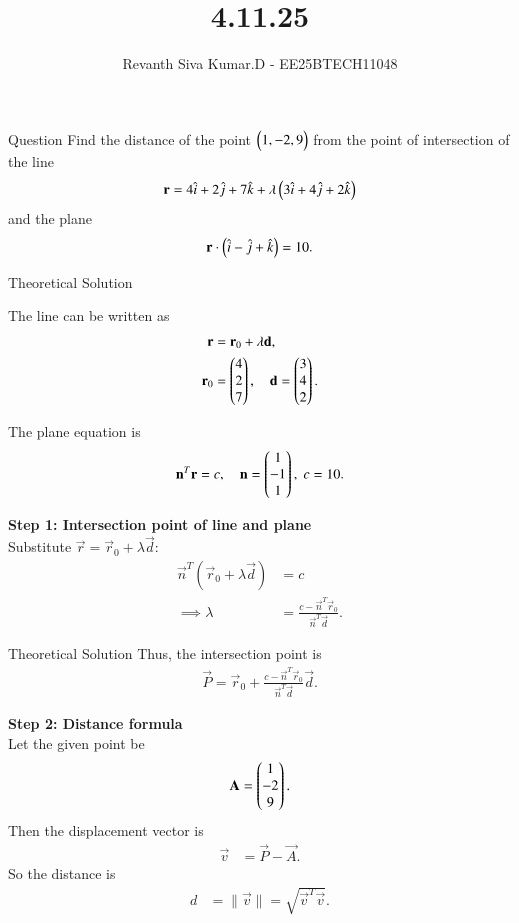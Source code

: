 \documentclass{beamer}
\title %
{4.11.25}
\author %
{Revanth Siva Kumar.D - EE25BTECH11048}
\begin{document}
	
	\frame{\titlepage}
	\begin{frame}{Question}
			Find the distance of the point $\begin{pmatrix}1,-2,9\end{pmatrix}$ from the point of intersection of the line
\[
\mathbf{r} = 4\hat{i} + 2\hat{j} + 7\hat{k} + \lambda \begin{pmatrix}3\hat{i} + 4\hat{j} + 2\hat{k}\end{pmatrix}
\]
and the plane
\[
\mathbf{r}\cdot\begin{pmatrix}\hat{i} - \hat{j} + \hat{k}\end{pmatrix} = 10.
\]
	\end{frame}
	
	
	\begin{frame}{Theoretical Solution}
			
The line can be written as
\begin{align}
    \mathbf{r} &= \mathbf{r}_0 + \lambda \mathbf{d}, \\
    \mathbf{r}_0 &= \begin{pmatrix}4 \\ 2 \\ 7\end{pmatrix}, \quad
    \mathbf{d} = \begin{pmatrix}3 \\ 4 \\ 2\end{pmatrix}.
\end{align}

The plane equation is
\begin{align}
    \mathbf{n}^T \mathbf{r} = c, \quad
    \mathbf{n} = \begin{pmatrix}1 \\ -1 \\ 1\end{pmatrix}, \; c = 10.
\end{align}

\textbf{Step 1: Intersection point of line and plane} \\
Substitute $\vec{r} = \vec{r}_0 + \lambda \vec{d}$:
\begin{align}
    \vec{n}^T(\vec{r}_0 + \lambda \vec{d}) &= c \\
    \implies \lambda &= \frac{c - \vec{n}^T\vec{r}_0}{\vec{n}^T\vec{d}}.
\end{align}
\end{frame}
\begin{frame}{Theoretical Solution}
Thus, the intersection point is
\begin{align}
    \vec{P} = \vec{r}_0 + 
    \frac{c - \vec{n}^T\vec{r}_0}{\vec{n}^T\vec{d}} \vec{d}.
\end{align}

\textbf{Step 2: Distance formula} \\
Let the given point be 
\begin{align}
    \mathbf{A} = \begin{pmatrix}1 \\ -2 \\ 9\end{pmatrix}.
\end{align}
Then the displacement vector is
\begin{align}
    \vec{v} &= \vec{P} - \vec{A}.
\end{align}
So the distance is
\begin{align}
    d &= \|\vec{v}\| = \sqrt{\vec{v}^T \vec{v}}.
\end{align}
\end{frame}
\end{document}
